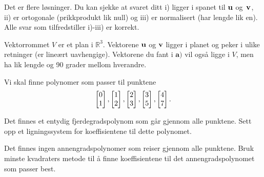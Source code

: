 \begin{losning}

\begin{punkt}
Det er flere løsninger. Du kan sjekke at svaret ditt i) ligger i spanet til $\mathbf{u}$ og~$\mathbf{v}$, ii) er ortogonale (prikkprodukt lik null) og iii) er normalisert (har lengde lik en). Alle svar som tilfredstiller i)-iii) er korrekt.
\end{punkt}
\begin{punkt}
Vektorrommet $V$ er et plan i $\mathbb{R}^3$. Vektorene $\mathbf{u}$ og $\mathbf{v}$ ligger i planet og peker i ulike retninger (er lineært uavhengige). Vektorene du fant i $\textbf{a)}$ vil også ligge i $V$, men ha lik lengde og 90 grader mellom hverandre.
\end{punkt}

\end{losning}

\begin{losning}
\end{losning}

%

\begin{oppgave}
Vi skal finne polynomer som passer til punktene
$$\begin{bmatrix} 0 \\ 1 \end{bmatrix}, \begin{bmatrix} 1 \\ 2 \end{bmatrix}, \begin{bmatrix} 2 \\ 3 \end{bmatrix},\begin{bmatrix} 3 \\ 5 \end{bmatrix},\begin{bmatrix} 4 \\ 7 \end{bmatrix}.$$

\begin{punkt}
Det finnes et entydig fjerdegradspolynom  som går gjennom alle punktene. Sett opp et ligningssystem for koeffisientene til dette polynomet. 
\end{punkt}

\begin{punkt}
Det finnes ingen annengradspolynomer som reiser gjennom alle punktene. Bruk minste kvadraters metode til å finne koeffisientene til det annengradspolynomet som passer best.
\end{punkt}


\end{oppgave}


